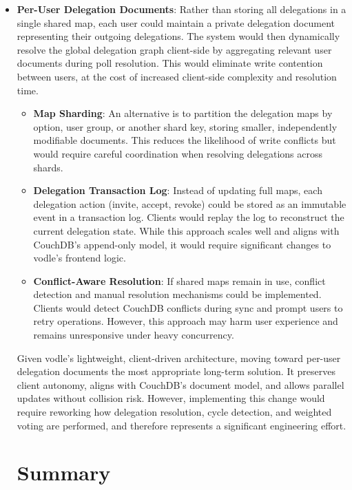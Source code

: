 \begin{itemize} \item \textbf{Per-User Delegation Documents}: Rather than storing all delegations in a single shared map, each user could maintain a private delegation document representing their outgoing delegations. The system would then dynamically resolve the global delegation graph client-side by aggregating relevant user documents during poll resolution. This would eliminate write contention between users, at the cost of increased client-side complexity and resolution time.

\begin{itemize}
\item \textbf{Map Sharding}: An alternative is to partition the delegation maps by option, user group, or another shard key, storing smaller, independently modifiable documents. This reduces the likelihood of write conflicts but would require careful coordination when resolving delegations across shards.

\item \textbf{Delegation Transaction Log}: Instead of updating full maps, each delegation action (invite, accept, revoke) could be stored as an immutable event in a transaction log. Clients would replay the log to reconstruct the current delegation state. While this approach scales well and aligns with CouchDB's append-only model, it would require significant changes to vodle's frontend logic.

\item \textbf{Conflict-Aware Resolution}: If shared maps remain in use, conflict detection and manual resolution mechanisms could be implemented. Clients would detect CouchDB conflicts during sync and prompt users to retry operations. However, this approach may harm user experience and remains unresponsive under heavy concurrency.
\end{itemize}

Given vodle's lightweight, client-driven architecture, moving toward per-user delegation documents the most appropriate long-term solution. It preserves client autonomy, aligns with CouchDB's document model, and allows parallel updates without collision risk. However, implementing this change would require reworking how delegation resolution, cycle detection, and weighted voting are performed, and therefore represents a significant engineering effort.

\section{Summary}


\end{itemize}
